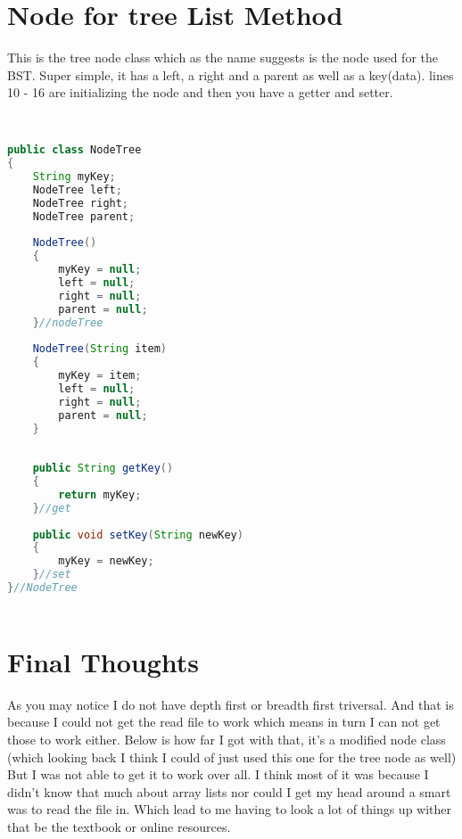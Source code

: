 \documentclass[letterpaper, 10pt]{article}
\begin{document}
\section{Node for tree List Method}
This is the tree node class which as the name suggests is the node used for the BST. Super simple, it has a left, a right and a parent as well as a key(data). lines 10 - 16 are initializing the node and then you have a getter and setter.
\begin{lstlisting}[language = java]


public class NodeTree 
{
	String myKey;
	NodeTree left;
	NodeTree right;
	NodeTree parent;
	
	NodeTree()
	{
		myKey = null;
		left = null;
		right = null;
		parent = null;
	}//nodeTree
	
	NodeTree(String item)
	{
		myKey = item;
		left = null;
		right = null;
		parent = null;
	}
	
	
	public String getKey()
	{
		return myKey;
	}//get
	
	public void setKey(String newKey)
	{
		myKey = newKey;
	}//set
}//NodeTree



\end{lstlisting}

\section{Final Thoughts}
As you may notice I do not have depth first or breadth first triversal. And that is because I could not get the read file to work which means in turn I can not get those to work either. Below is how far I got with that, it's a modified node class (which looking back I think I could of just used this one for the tree node as well) But I was not able to get it to work over all. I think most of it was because I didn't know that much about array lists nor could I get my head around a smart was to read the file in. Which lead to me having to look a lot of things up wither that be the textbook or online resources.
\end{document}
